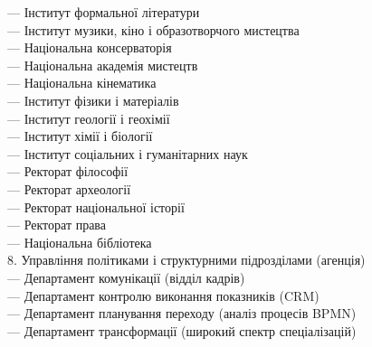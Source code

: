 \hspace{2cm}     — Інститут формальної літератури \\
\hspace{2cm}     — Інститут музики, кіно і образотворчого мистецтва \\
\hspace{4cm}         — Національна консерваторія \\
\hspace{4cm}         — Національна академія мистецтв \\
\hspace{4cm}         — Національна кінематика \\
\hspace{2cm}     — Інститут фізики і матеріалів \\
\hspace{2cm}     — Інститут геології і геохімії \\
\hspace{2cm}     — Інститут хімії і біології \\
\hspace{2cm}     — Інститут соціальних і гуманітарних наук \\
\hspace{4cm}         — Ректорат філософії \\
\hspace{4cm}         — Ректорат археології \\
\hspace{4cm}         — Ректорат національної історії \\
\hspace{4cm}         — Ректорат права \\
\hspace{4cm}         — Національна бібліотека \\
8. Управління політиками і структурними підрозділами (агенція) \\
\hspace{2cm}     — Департамент комунікації (відділ кадрів) \\
\hspace{2cm}     — Департамент контролю виконання показників (CRM) \\
\hspace{2cm}     — Департамент планування переходу (аналіз процесів BPMN) \\
\hspace{2cm}     — Департамент трансформації (широкий спектр спеціалізацій) \\

